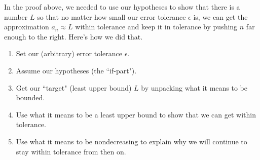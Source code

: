 \begin{remark}
In the proof above, we needed to use our hypotheses to show that there is a number $L$ so that no matter how small our error tolerance $\epsilon$ is, we can get the approximation $a_n\approx L$ within tolerance and keep it in tolerance by pushing $n$ far enough to the right.
Here's how we did that.
\begin{enumerate}
\item Set our (arbitrary) error tolerance $\epsilon$.
\item Assume our hypotheses (the ``if-part").
\item Get our ``target" (least upper bound) $L$ by unpacking what it means to be bounded.
\item Use what it means to be a least upper bound to show that we can get within tolerance.
\item Use what it means to be nondecreasing to explain why we will continue to stay within tolerance from then on.
\end{enumerate}
\end{remark}

